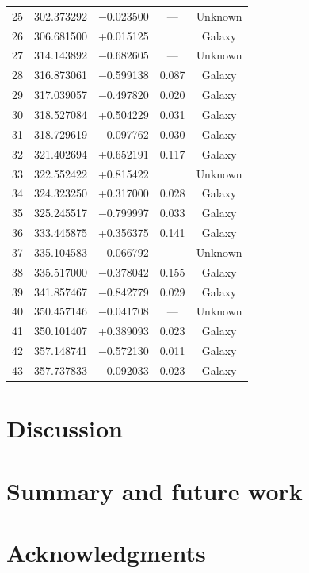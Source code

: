 \documentclass[times,usenatbib]{mn2e}
\begin{document}
\begin{table}
\begin{center}
\begin{tabular}{lcccc}
25 & 302.373292 & $-$0.023500 & ---   & Unknown \\
26 & 306.681500 & +0.015125 &    & Galaxy \\
27 & 314.143892 & $-$0.682605 & ---   & Unknown \\
28 & 316.873061 & $-$0.599138 & 0.087 & Galaxy \\
29 & 317.039057 & $-$0.497820 & 0.020 & Galaxy \\
30 & 318.527084 & +0.504229 &   0.031 & Galaxy \\
31 & 318.729619 & $-$0.097762 & 0.030 & Galaxy \\
32 & 321.402694 & +0.652191 &   0.117 & Galaxy \\
33 & 322.552422 & +0.815422 &    & Unknown \\
34 & 324.323250 & +0.317000 &   0.028 & Galaxy \\
35 & 325.245517 & $-$0.799997 & 0.033 & Galaxy \\
36 & 333.445875 & +0.356375 &   0.141 & Galaxy \\
37 & 335.104583 & $-$0.066792 & ---   & Unknown \\
38 & 335.517000 & $-$0.378042 & 0.155 & Galaxy \\
39 & 341.857467 & $-$0.842779 & 0.029 & Galaxy \\
40 & 350.457146 & $-$0.041708 & ---   & Unknown \\
41 & 350.101407 & +0.389093 &   0.023 & Galaxy \\
42 & 357.148741 & $-$0.572130 & 0.011 & Galaxy \\
43 & 357.737833 & $-$0.092033 & 0.023 & Galaxy \\
\hline
\end{tabular}
\end{center}
\label{galaxy-catalogue}
\end{table}

\section{Discussion}

\section{Summary and future work}

\section*{Acknowledgments}
\end{document}
